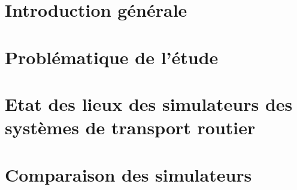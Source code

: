 \documentclass[12pt,a4paper]{article}
\begin{document}


\section{Introduction générale}\label{sec:intro}



\section{Problématique de l'étude}\label{sec:problematic}



\section{Etat des lieux des simulateurs des systèmes de transport routier}\label{sec:simulators}




\section{Comparaison des simulateurs}\label{sec:comparaison}


\end{document}
